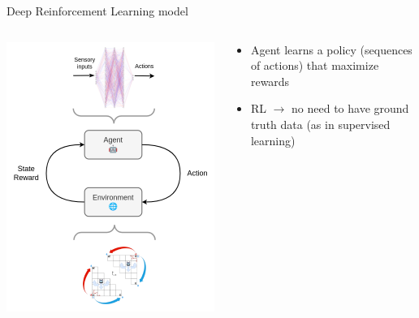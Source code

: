 \documentclass[bigger]{beamer}
\begin{document}
\begin{frame}[label={sec:orgcb37737}]{Deep Reinforcement Learning model}
\begin{columns}
\begin{column}[c]{0.5\columnwidth}
\begin{center}
\includegraphics[height=0.9\textheight]{medias/nn.drawio.png}
\end{center}
\end{column}
\begin{column}[c]{0.5\columnwidth}
\pause
\begin{itemize}
\item Agent learns a policy (sequences of actions) that maximize rewards
\end{itemize}
\pause
\begin{itemize}
\item RL \(\to\) no need to have ground truth data (as in supervised learning)
\end{itemize}
\end{column}
\end{columns}
\end{frame}
\end{document}
